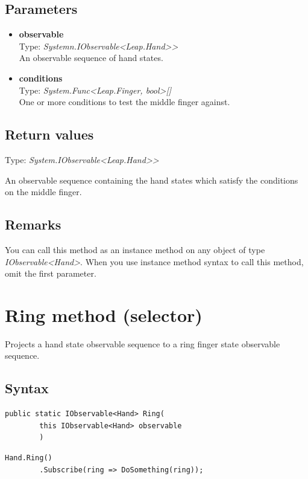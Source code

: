 \documentclass[12pt,a4paper,twoside]{report}
\begin{document}
\subsection{Parameters}

\begin{itemize}
    \item \textbf{observable}\\
        Type: \textit{Systemn.IObservable<Leap.Hand>{}>}\\
        An observable sequence of hand states.
    \item \textbf{conditions}\\
        Type: \textit{System.Func<Leap.Finger, bool>[]}\\
        One or more conditions to test the middle finger against.
\end{itemize}

\subsection{Return values}
Type: \textit{System.IObservable<Leap.Hand>{}>}

An observable sequence containing the hand states which satisfy the conditions on the middle finger.

\subsection{Remarks}
You can call this method as an instance method on any object of type \textit{IObservable<Hand>}. When you use 
instance method syntax to call this method, omit the first parameter.

\section{Ring method (selector)}
Projects a hand state observable sequence to a ring finger state observable sequence.

\subsection{Syntax}
\begin{lstlisting}[caption=Declaration]
    public static IObservable<Hand> Ring(
        this IObservable<Hand> observable
        )
\end{lstlisting}

\begin{lstlisting}[caption=Usage example]
    Hand.Ring()
        .Subscribe(ring => DoSomething(ring));
\end{lstlisting}
\end{document}
